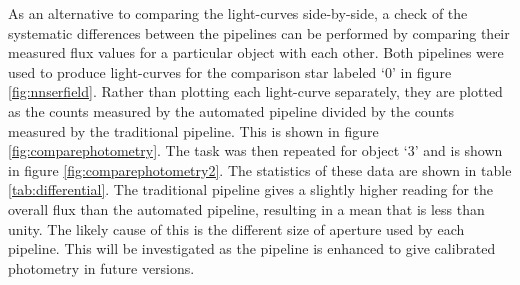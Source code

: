 

As an alternative to comparing the light-curves side-by-side, a check of the systematic differences between the pipelines can be performed by comparing their measured flux values for a particular object with each other. Both pipelines were used to produce light-curves for the comparison star labeled `0' in figure \ref{fig:nnserfield}. Rather than plotting each light-curve separately, they are plotted as the counts measured by the automated pipeline divided by the counts measured by the traditional pipeline. This is shown in figure \ref{fig:comparephotometry}. The task was then repeated for object `3' and is shown in figure \ref{fig:comparephotometry2}. The statistics of these data are shown in table \ref{tab:differential}. The traditional pipeline gives a slightly higher reading for the overall flux than the automated pipeline, resulting in a mean that is less than unity. The likely cause of this is the different size of aperture used by each pipeline. This will be investigated as the pipeline is enhanced to give calibrated photometry in future versions. 

